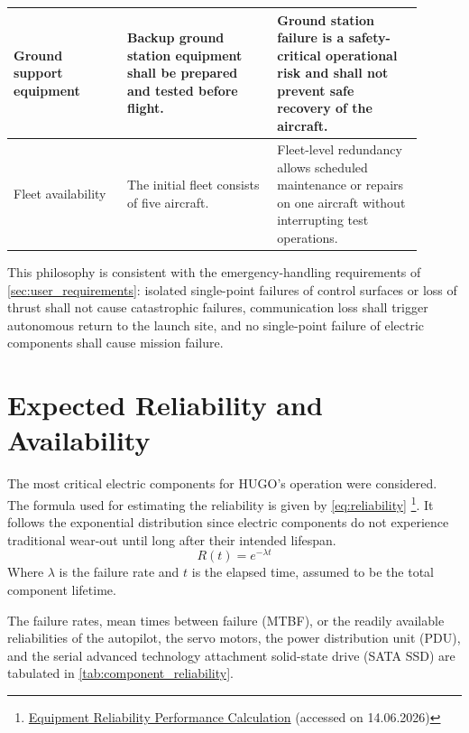\begin{longtable}{|p{0.25\linewidth}|p{0.33\linewidth}|p{0.32\linewidth}|}
    Ground support equipment &
    Backup ground station equipment shall be prepared and tested before flight. &
    Ground station failure is a safety-critical operational risk and shall not prevent safe recovery of the aircraft. \\
    \hline

    Fleet availability &
    The initial fleet consists of five aircraft. &
    Fleet-level redundancy allows scheduled maintenance or repairs on one aircraft without interrupting test operations. \\
    \hline

\end{longtable}

This philosophy is consistent with the emergency-handling requirements of \autoref{sec:user_requirements}: isolated single-point failures of control surfaces or loss of thrust shall not cause catastrophic failures, communication loss shall trigger autonomous return to the launch site, and no single-point failure of electric components shall cause mission failure.

\section{Expected Reliability and Availability}
\label{sec:reliability_availability}

The most critical electric components for HUGO's operation were considered. The formula used for estimating the reliability is given by \autoref{eq:reliability} \footnote{\href{https://www.reliabilityengineersacademy.com/articles/fc13d06a-bc39-44bf-9d23-f48d0d413960}{Equipment Reliability Performance Calculation} (accessed on 14.06.2026)}. It follows the exponential distribution since electric components do not experience traditional wear-out until long after their intended lifespan.
\begin{equation}
    R(t) = e^{-\lambda t}
    \label{eq:reliability}
\end{equation}
Where $\lambda$ is the failure rate and $t$ is the elapsed time, assumed to be the total component lifetime.

The failure rates, mean times between failure (MTBF), or the readily available reliabilities of the autopilot, the servo motors, the power distribution unit (PDU), and the serial advanced technology attachment solid-state drive (SATA SSD) are tabulated in \autoref{tab:component_reliability}. %

